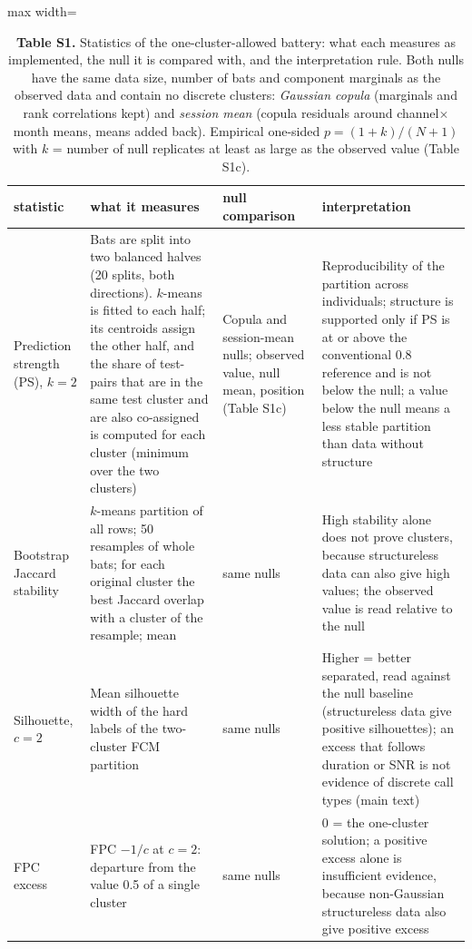 \documentclass[11pt]{article}
\begin{document}
\begin{table}[htbp]\centering\scriptsize
\caption{\textbf{Table S1.} Statistics of the one-cluster-allowed battery: what each measures as implemented, the null it is compared with, and the interpretation rule. Both nulls have the same data size, number of bats and component marginals as the observed data and contain no discrete clusters: \emph{Gaussian copula} (marginals and rank correlations kept) and \emph{session mean} (copula residuals around channel$\times$month means, means added back). Empirical one-sided $p=(1+k)/(N+1)$ with $k$ = number of null replicates at least as large as the observed value (Table S1c).}
\begin{adjustbox}{max width=\linewidth}
\begin{tabular}{p{2.2cm}p{5.9cm}p{3.0cm}p{5.4cm}}
\toprule
statistic & what it measures & null comparison & interpretation \\
\midrule
Prediction strength (PS), $k=2$ & Bats are split into two balanced halves (20 splits, both directions). $k$-means is fitted to each half; its centroids assign the other half, and the share of test-pairs that are in the same test cluster and are also co-assigned is computed for each cluster (minimum over the two clusters) & Copula and session-mean nulls; observed value, null mean, position (Table S1c) & Reproducibility of the partition across individuals; structure is supported only if PS is at or above the conventional 0.8 reference and is not below the null; a value below the null means a less stable partition than data without structure \\
Bootstrap Jaccard stability & $k$-means partition of all rows; 50 resamples of whole bats; for each original cluster the best Jaccard overlap with a cluster of the resample; mean & same nulls & High stability alone does not prove clusters, because structureless data can also give high values; the observed value is read relative to the null \\
Silhouette, $c=2$ & Mean silhouette width of the hard labels of the two-cluster FCM partition & same nulls & Higher = better separated, read against the null baseline (structureless data give positive silhouettes); an excess that follows duration or SNR is not evidence of discrete call types (main text) \\
FPC excess & FPC $-1/c$ at $c=2$: departure from the value 0.5 of a single cluster & same nulls & $0$ = the one-cluster solution; a positive excess alone is insufficient evidence, because non-Gaussian structureless data also give positive excess \\

\end{tabular}
\end{adjustbox}
\end{table}
\end{document}
